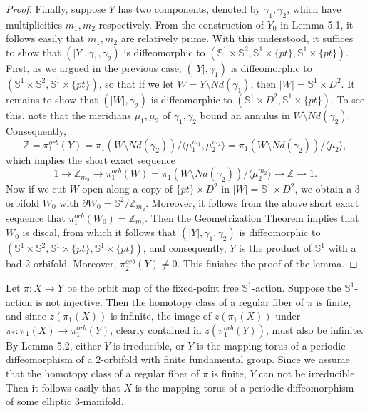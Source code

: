 \documentclass[11pt]{amsart}
\theoremstyle{plain}
\numberwithin{theorem}{section}
\theoremstyle{definition}
\begin{document}
\begin{proof}
Finally, suppose $Y$ has two components, denoted by $\gamma_1,\gamma_2$, which
have multiplicities $m_1, m_2$ respectively. From the construction of $Y_0$ in Lemma 5.1,
it follows easily that $m_1,m_2$ are relatively prime. With this understood, it suffices to 
show that $(|Y|,\gamma_1,\gamma_2)$ is diffeomorphic to 
$({{\mathbb S}}^1\times {{\mathbb S}}^2, {{\mathbb S}}^1\times \{pt\},{{\mathbb S}}^1\times \{pt\})$. First, as we argued in the previous case,  
$(|Y|,\gamma_1)$ is diffeomorphic to $({{\mathbb S}}^1\times {{\mathbb S}}^2, {{\mathbb S}}^1\times \{pt\})$, so that if we let 
$W=Y\setminus Nd(\gamma_1)$, then $|W|={{\mathbb S}}^1\times D^2$.
It remains to show that $(|W|,\gamma_2)$ is diffeomorphic to $({{\mathbb S}}^1\times D^2, {{\mathbb S}}^1\times \{pt\})$. 
To see this, note that the meridians $\mu_1,\mu_2$ of $\gamma_1,\gamma_2$ bound an 
annulus in $W\setminus Nd(\gamma_2)$. Consequently, 
$$
{{\mathbb Z}}=\pi_1^{orb}(Y)=\pi_1(W\setminus Nd(\gamma_2))/\langle \mu_1^{m_1},\mu_2^{m_2}\rangle=
\pi_1(W\setminus Nd(\gamma_2))/\langle \mu_2\rangle,
$$
which implies the short exact sequence 
$$
1\rightarrow {{\mathbb Z}}_{m_2}\rightarrow \pi_1^{orb}(W)=\pi_1(W\setminus Nd(\gamma_2))/\langle \mu_2^{m_2}\rangle\rightarrow {{\mathbb Z}}\rightarrow 1.
$$
Now if we cut $W$ open along a copy of $\{pt\}\times D^2$ in $|W|={{\mathbb S}}^1\times D^2$, 
we obtain a $3$-orbifold $W_0$ with $\partial W_0={{\mathbb S}}^2/{{\mathbb Z}}_{m_2}$. Moreover, it follows from the above short exact sequence that $\pi_1^{orb}(W_0)={{\mathbb Z}}_{m_2}$. Then the Geometrization 
Theorem implies that $W_0$ is discal, from which it follows that 
$(|Y|,\gamma_1,\gamma_2)$ is diffeomorphic to 
$({{\mathbb S}}^1\times {{\mathbb S}}^2, {{\mathbb S}}^1\times \{pt\},{{\mathbb S}}^1\times \{pt\})$, and consequently, $Y$ is the product
of ${{\mathbb S}}^1$ with a bad $2$-orbifold. Moreover, $\pi_2^{orb}(Y)\neq 0$.
This finishes the proof of the lemma.

\end{proof}


\vspace{3mm}

Let $\pi: X\rightarrow Y$ be the orbit map of the fixed-point free ${{\mathbb S}}^1$-action. 
Suppose the ${{\mathbb S}}^1$-action is not injective. Then the homotopy class of a regular fiber of 
$\pi$ is finite, and since $z(\pi_1(X))$ is infinite, the image of $z(\pi_1(X))$ under 
$\pi_\ast: \pi_1(X)\rightarrow \pi_1^{orb}(Y)$, clearly contained in 
$z(\pi_1^{orb}(Y))$, must also be infinite. By Lemma 5.2, either $Y$ is irreducible, or
$Y$ is the mapping torus of a periodic diffeomorphism of a $2$-orbifold with finite 
fundamental group. Since we assume that the homotopy class of a regular fiber of $\pi$ 
is finite, $Y$ can not be irreducible. Then it follows easily that $X$ is the mapping torus
of a periodic diffeomorphism of some elliptic $3$-manifold. 
\end{document}
